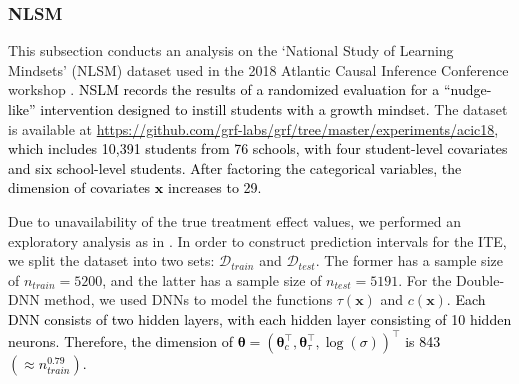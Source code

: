 \documentclass[11pt]{article}
\newcommand{\bx}{{\boldsymbol x}}
\newcommand{\btheta}{{\boldsymbol \theta}}
\begin{document}
\subsubsection{NLSM}





This subsection conducts an analysis on
the `National Study of Learning Mindsets' (NLSM) dataset used in the 2018 Atlantic Causal Inference Conference workshop \citep{yeager2019nlsm,Carvalho2019AssessingTE}. 
\textcolor{black}{NSLM records the results of a randomized evaluation for a ``nudge-like'' intervention designed to instill students with a growth mindset.}
The dataset is available at \url{https://github.com/grf-labs/grf/tree/master/experiments/acic18}, \textcolor{black}{which includes 10,391 students from 76 schools, 
with four student-level covariates and six school-level students. 
After factoring the categorical variables, the dimension of covariates $\bx$ increases to 29.}


Due to unavailability of the true treatment effect values, we performed an exploratory analysis
as in \cite{lei2021ite}. In order to construct prediction intervals for the ITE, we split the dataset into two sets: $\mathcal{D}_{train}$ and $\mathcal{D}_{test}$. The former has a sample size of $n_{train}=5200$, and 
the latter has a sample size of $n_{test}=5191$. 
For the Double-DNN method,  we used DNNs to 
 model the functions $\tau(\bx)$ and $c(\bx)$. 
\textcolor{black}{Each DNN consists of two hidden layers, with each hidden layer 
 consisting of 10 hidden neurons. Therefore,  
the dimension of $\btheta=(\btheta_c^{\top},\btheta_{\tau}^{\top},\log(\sigma))^{\top}$ is 843 $(\approx n_{train}^{0.79})$.}
\end{document}
